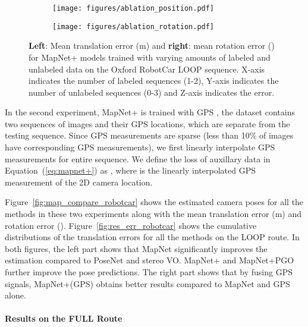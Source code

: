 \begin{figure}
    \centering
    \begin{subfigure}{0.49\linewidth}
        \centering
        \texttt{[image: figures/ablation\_position.pdf]}
    \end{subfigure}
    \hfill
    \begin{subfigure}{0.49\linewidth}
        \centering
        \texttt{[image: figures/ablation\_rotation.pdf]}
    \end{subfigure}
    \vspace{-1em} 
    \caption{\small \textbf{Left}: Mean translation error (m) and \textbf{right}: mean rotation error (\degree) for MapNet+ models trained with 
    varying amounts of labeled and unlabeled data on the Oxford RobotCar LOOP sequence. 
    X-axis indicates the number of labeled sequences (1-2), Y-axis indicates the number of unlabeled sequences (0-3) and Z-axis indicates the error.}
    \label{fig:loop_ablation_robotcar}
\end{figure}


In the second experiment, MapNet+ is trained with GPS \ie, 
the dataset  contains two sequences of images and their GPS locations, which are separate from the testing sequence.
Since GPS measurements are sparse
(less than 10\% of images have corresponding GPS measurements), we
first linearly interpolate GPS measurements for entire sequence. We
define the loss of auxillary data  in Equation~(\ref{eq:mapnet+})
as , where  is the linearly interpolated GPS measurement of the 2D
camera location. 

Figure~\ref{fig:map_compare_robotcar} shows the estimated camera poses for all
the methods in these two experiments along with the mean translation error (m) and rotation
error (\degree). 
Figure~\ref{fig:res_err_robotcar} shows the cumulative distributions of
the translation errors for all the methods on the LOOP route. In both figures, 
the left part shows that MapNet significantly improves the estimation compared to PoseNet and stereo VO.
MapNet+ and MapNet+PGO further improve the pose predictions. 
The right part shows that by fusing GPS signals,
MapNet+(GPS) obtains better results compared to MapNet and GPS alone.

\vspace{-.5em}
\paragraph{Results on the FULL Route}




